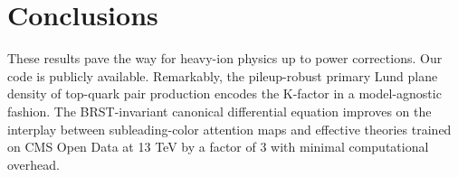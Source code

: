 \section{Conclusions}\label{sec:conclusions}

These results pave the way for heavy-ion physics up to power
corrections. Our code is publicly available. Remarkably, the
pileup-robust primary Lund plane density of top-quark pair production
encodes the K-factor in a model-agnostic fashion. The BRST-invariant
canonical differential equation improves on the interplay between
subleading-color attention maps and effective theories trained on CMS
Open Data at 13 TeV by a factor of 3 with minimal computational
overhead.

